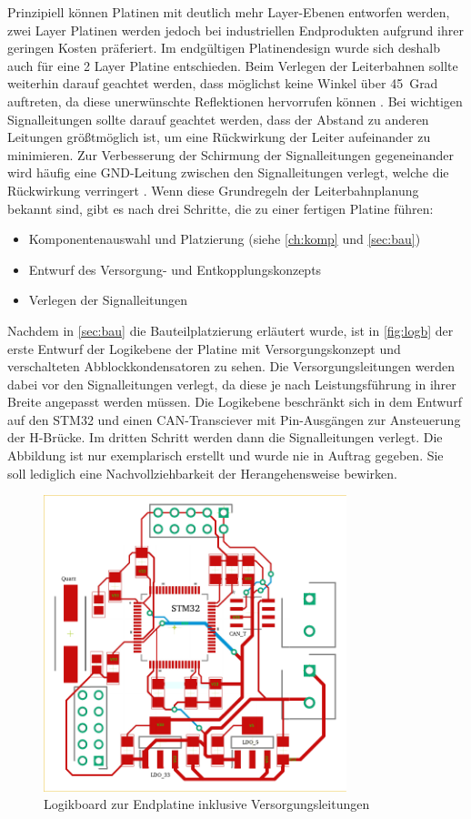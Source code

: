 Prinzipiell können Platinen mit deutlich mehr Layer-Ebenen entworfen werden, zwei Layer Platinen werden jedoch bei industriellen Endprodukten aufgrund ihrer geringen Kosten präferiert\cite[S.13]{emcdes}. Im endgültigen Platinendesign wurde sich deshalb auch für eine 2 Layer Platine entschieden. Beim Verlegen der Leiterbahnen sollte weiterhin darauf geachtet werden, dass möglichst keine Winkel über \SI{45}{Grad} auftreten, da diese unerwünschte Reflektionen hervorrufen können \cite[S.17]{emcdes}. Bei wichtigen Signalleitungen sollte darauf geachtet werden, dass der Abstand zu anderen Leitungen größtmöglich ist, um eine Rückwirkung der Leiter aufeinander zu minimieren. Zur Verbesserung der Schirmung der Signalleitungen gegeneinander wird häufig eine GND-Leitung zwischen den Signalleitungen verlegt, welche die Rückwirkung verringert \cite[S.45]{Franz2012}.
Wenn diese Grundregeln der Leiterbahnplanung bekannt sind, gibt es nach \cite[S.12]{emcdes} drei Schritte, die zu einer fertigen Platine führen:
\begin{itemize}
	\item Komponentenauswahl und Platzierung (siehe \autoref{ch:komp} und \autoref{sec:bau})
	\item Entwurf des Versorgung- und Entkopplungskonzepts
	\item Verlegen der Signalleitungen
\end{itemize}
Nachdem in \autoref{sec:bau} die Bauteilplatzierung erläutert wurde, ist in \autoref{fig:logb} der erste Entwurf der Logikebene der Platine mit Versorgungskonzept und verschalteten Abblockkondensatoren zu sehen. Die Versorgungsleitungen werden dabei vor den Signalleitungen verlegt, da diese je nach Leistungsführung in ihrer Breite angepasst werden müssen. Die Logikebene beschränkt sich in dem Entwurf auf den STM32 und einen CAN-Transciever mit Pin-Ausgängen zur Ansteuerung der H-Brücke. Im dritten Schritt werden dann die Signalleitungen verlegt. Die Abbildung ist nur exemplarisch erstellt und wurde nie in Auftrag gegeben. Sie soll lediglich eine Nachvollziehbarkeit der Herangehensweise bewirken.
\begin{figure}[H]%
\centering
\includegraphics[width=250pt]{./Bilder/logb}%
\caption{Logikboard zur Endplatine inklusive Versorgungsleitungen}%
\label{fig:logb}%
\end{figure}
